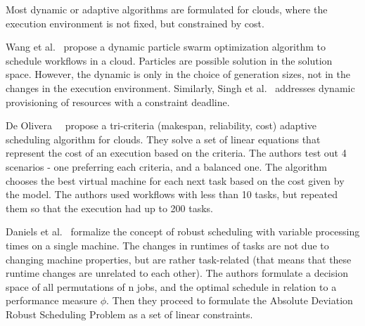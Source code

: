 \documentclass[conference]{IEEEtran}
\begin{document}


    Most dynamic or adaptive algorithms are formulated for clouds, where the execution environment is not fixed,
    but constrained by cost.

    Wang et al.~\cite{wang2019dynamic} propose a dynamic particle swarm optimization algorithm to schedule workflows in a cloud.
    Particles are possible solution in the solution space.
    However, the dynamic is only in the choice of generation sizes, not in the changes in the execution environment.
    Similarly, Singh et al.~\cite{singh2018novel} addresses dynamic provisioning of resources with a constraint deadline.

    De Olivera~\etal~\cite{de2012provenance} propose a tri-criteria (makespan, reliability, cost) adaptive scheduling algorithm
    for clouds.
    They solve a set of linear equations that represent the cost of an execution based on the criteria.
    The authors test out 4 scenarios - one preferring each criteria, and a balanced one.
    The algorithm chooses the best virtual machine for each next task based on the cost given by the model.
    The authors used workflows with less than 10 tasks, but repeated them so that the execution had up to 200 tasks.


    Daniels et al.~\cite{daniels1995robust} formalize the concept of robust scheduling with variable processing times
    on a single machine.
    The changes in runtimes of tasks are not due to changing machine properties, but are rather task-related (that means
    that these runtime changes are unrelated to each other).
    The authors formulate a decision space of all permutations of n jobs, and the optimal schedule in relation to a
    performance measure $\phi$.
    Then they proceed to formulate the Absolute Deviation Robust Scheduling Problem as a set of linear constraints.
\end{document}
